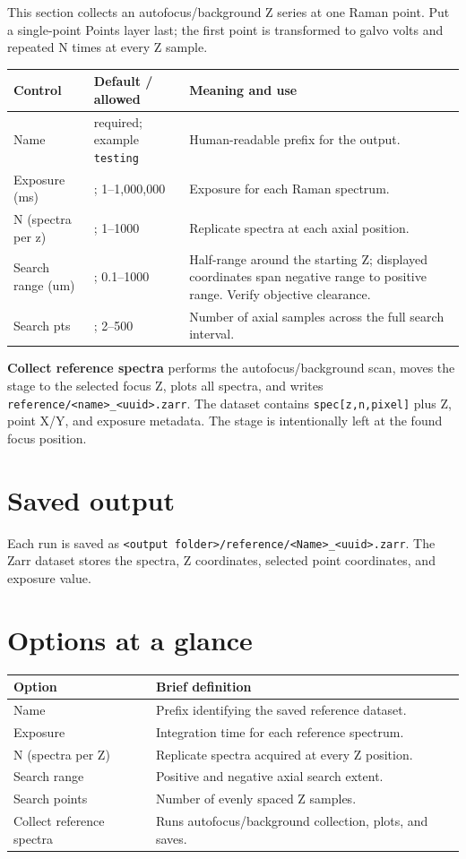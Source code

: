 \documentclass[11pt,oneside]{report}
\makeatletter
\newcommand{\ui}[1]{\textbf{#1}}
\newcommand{\code}[1]{\texttt{#1}}
\newcommand{\fieldtable}{\begin{longtable}{@{}>{\raggedright\arraybackslash}p{0.25\textwidth}>{\raggedright\arraybackslash}p{0.18\textwidth}>{\raggedright\arraybackslash}p{0.50\textwidth}@{}}\toprule\textbf{Control} & \textbf{Default / allowed} & \textbf{Meaning and use}\\\midrule\endhead}
\newcommand{\endfieldtable}{\bottomrule\end{longtable}}
\makeatother
\begin{document}
This section collects an autofocus/background Z series at one Raman point. Put a
single-point Points layer last; the first point is transformed to galvo volts and
repeated N times at every Z sample.

\fieldtable
Name & required; example \code{testing} & Human-readable prefix for the output.\\
Exposure (ms) & 1000; 1--1,000,000 & Exposure for each Raman spectrum.\\
N (spectra per z) & 5; 1--1000 & Replicate spectra at each axial position.\\
Search range (um) & 10; 0.1--1000 & Half-range around the starting Z; displayed
coordinates span negative range to positive range. Verify objective clearance.\\
Search pts & 20; 2--500 & Number of axial samples across the full search interval.\\
\endfieldtable

\ui{Collect reference spectra} performs the autofocus/background scan, moves the
stage to the selected focus Z, plots all spectra, and writes
\code{reference/<name>\_<uuid>.zarr}. The dataset contains \code{spec[z,n,pixel]}
plus Z, point X/Y, and exposure metadata. The stage is intentionally left at the
found focus position.

\section*{Saved output}
Each run is saved as
\code{<output folder>/reference/<Name>\_<uuid>.zarr}. The Zarr dataset stores the
spectra, Z coordinates, selected point coordinates, and exposure value.

\section*{Options at a glance}
\begin{longtable}{@{}p{}p{}@{}}
\toprule\textbf{Option} & \textbf{Brief definition}\\\midrule
Name & Prefix identifying the saved reference dataset.\\
Exposure & Integration time for each reference spectrum.\\
N (spectra per Z) & Replicate spectra acquired at every Z position.\\
Search range & Positive and negative axial search extent.\\
Search points & Number of evenly spaced Z samples.\\
Collect reference spectra & Runs autofocus/background collection, plots, and saves.\\
\bottomrule\end{longtable}
\end{document}
